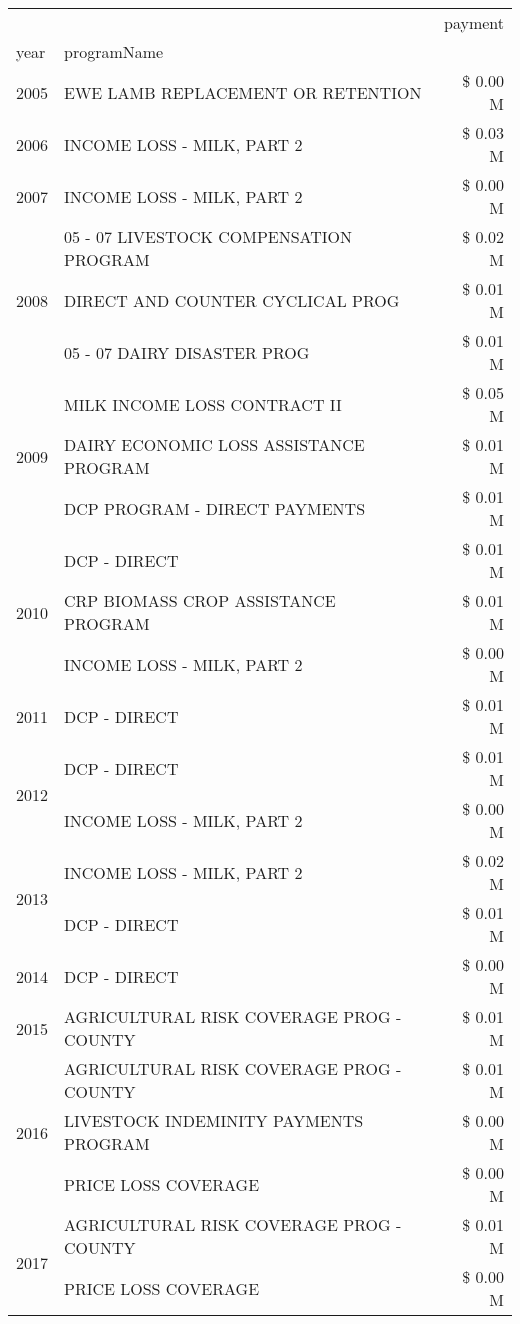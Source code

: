 \begin{tabular}{llr}
\toprule
 &  & payment \\
year & programName &  \\
\midrule
2005 & EWE LAMB REPLACEMENT OR RETENTION & \$ 0.00 M \\
\cline{1-3}
2006 & INCOME LOSS - MILK, PART 2 & \$ 0.03 M \\
\cline{1-3}
2007 & INCOME LOSS - MILK, PART 2 & \$ 0.00 M \\
\cline{1-3}
\multirow[t]{3}{*}{2008} & 05 - 07 LIVESTOCK COMPENSATION PROGRAM & \$ 0.02 M \\
 & DIRECT AND COUNTER CYCLICAL PROG & \$ 0.01 M \\
 & 05 - 07 DAIRY DISASTER PROG & \$ 0.01 M \\
\cline{1-3}
\multirow[t]{3}{*}{2009} & MILK INCOME LOSS CONTRACT II & \$ 0.05 M \\
 & DAIRY ECONOMIC LOSS ASSISTANCE PROGRAM & \$ 0.01 M \\
 & DCP PROGRAM - DIRECT PAYMENTS & \$ 0.01 M \\
\cline{1-3}
\multirow[t]{3}{*}{2010} & DCP - DIRECT & \$ 0.01 M \\
 & CRP BIOMASS CROP ASSISTANCE PROGRAM & \$ 0.01 M \\
 & INCOME LOSS - MILK, PART 2 & \$ 0.00 M \\
\cline{1-3}
2011 & DCP - DIRECT & \$ 0.01 M \\
\cline{1-3}
\multirow[t]{2}{*}{2012} & DCP - DIRECT & \$ 0.01 M \\
 & INCOME LOSS - MILK, PART 2 & \$ 0.00 M \\
\cline{1-3}
\multirow[t]{2}{*}{2013} & INCOME LOSS - MILK, PART 2 & \$ 0.02 M \\
 & DCP - DIRECT & \$ 0.01 M \\
\cline{1-3}
2014 & DCP - DIRECT & \$ 0.00 M \\
\cline{1-3}
2015 & AGRICULTURAL RISK COVERAGE PROG - COUNTY & \$ 0.01 M \\
\cline{1-3}
\multirow[t]{3}{*}{2016} & AGRICULTURAL RISK COVERAGE PROG - COUNTY & \$ 0.01 M \\
 & LIVESTOCK INDEMINITY PAYMENTS PROGRAM & \$ 0.00 M \\
 & PRICE LOSS COVERAGE & \$ 0.00 M \\
\cline{1-3}
\multirow[t]{2}{*}{2017} & AGRICULTURAL RISK COVERAGE PROG - COUNTY & \$ 0.01 M \\
 & PRICE LOSS COVERAGE & \$ 0.00 M \\
\cline{1-3}

\end{tabular}
